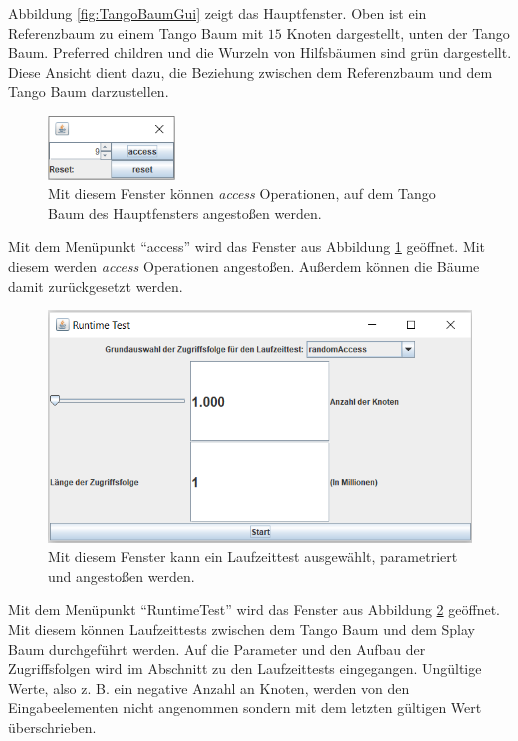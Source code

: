 \documentclass[a4paper,12pt]{article}
\begin{document}
\noindent Abbildung \ref{fig:TangoBaumGui} zeigt das Hauptfenster. Oben ist ein Referenzbaum zu einem Tango Baum mit  $15$ Knoten dargestellt, unten der Tango Baum. Preferred children und die Wurzeln von Hilfsbäumen sind grün dargestellt.
Diese Ansicht dient dazu, die Beziehung zwischen dem Referenzbaum und dem Tango Baum darzustellen.

\begin{figure}[H]
	\centering
	\includegraphics[width=0.3\textwidth]{"Medien/laufzeittest/accessGUI"}
	\caption{Mit diesem Fenster können  \textit{access} Operationen, auf dem Tango Baum des Hauptfensters angestoßen werden.}
	\label{fig:accessGui}
\end{figure}
\noindent Mit dem Menüpunkt \enquote{access} wird das Fenster aus Abbildung \ref{fig:accessGui} geöffnet. Mit diesem werden \textit{access} Operationen angestoßen. Außerdem können die Bäume damit zurückgesetzt werden.

\begin{figure}[H]
	\centering
	\includegraphics[width=1\textwidth]{"Medien/laufzeittest/RuntimeGui"}
	\caption{Mit diesem Fenster kann ein Laufzeittest ausgewählt, parametriert und angestoßen werden.}
	\label{fig:RuntimeGui}
\end{figure}

\noindent Mit dem Menüpunkt \enquote{RuntimeTest} wird das Fenster aus Abbildung \ref{fig:RuntimeGui} geöffnet. Mit diesem können Laufzeittests zwischen dem Tango Baum und dem Splay Baum  durchgeführt werden. Auf die Parameter und den Aufbau der Zugriffsfolgen wird im Abschnitt zu den Laufzeittests eingegangen. Ungültige Werte, also z. B. ein negative Anzahl an Knoten, werden von den Eingabeelementen nicht angenommen sondern mit dem letzten gültigen Wert überschrieben.
\end{document}
